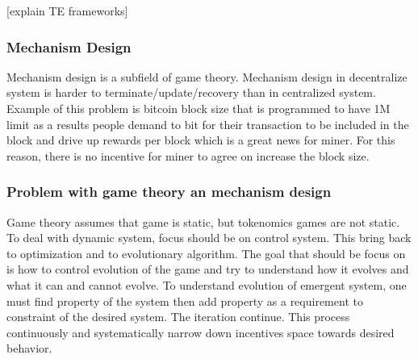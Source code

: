 \documentclass{IEEEtran}
\begin{document}
[explain TE frameworks]

\subsubsection{Mechanism Design}
\label{sec:org20c051c}
Mechanism design is a subfield of game theory. Mechanism design in decentralize system is harder to terminate/update/recovery than in centralized system.
Example of this problem is bitcoin block size that is programmed to have 1M limit as a results people demand to bit for their transaction to be included in the block and drive up rewards per block which is a great news for miner. For this reason, there is no incentive for miner to agree on increase the block size.
\subsubsection{Problem with game theory an mechanism design}
\label{sec:org71d23b1}
Game theory assumes that game is static, but tokenomics games are not static. To deal with dynamic system, focus should be on control system. This bring back to optimization and to evolutionary algorithm. The goal that should be focus on is how to control evolution of the game and try to understand how it evolves and what it can and cannot evolve. To understand evolution of emergent system, one must find property of the system then add property as a requirement to constraint of the desired system. The iteration continue. This process continuously and systematically narrow down incentives space towards desired behavior.
\end{document}
